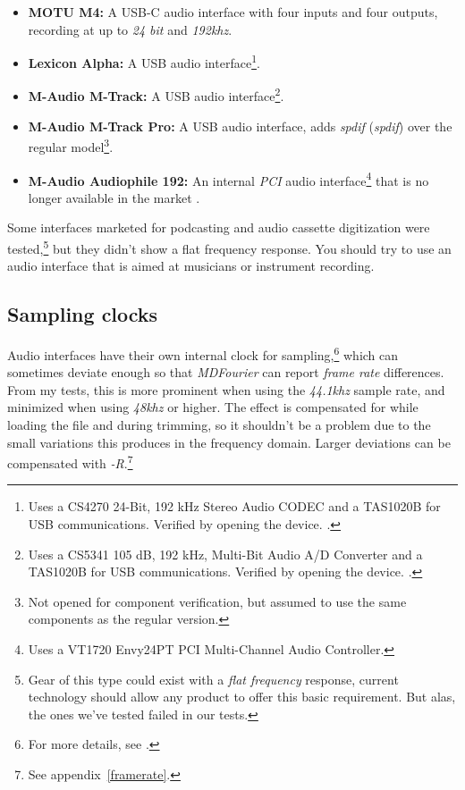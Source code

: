 \documentclass[10pt,a4paper]{report}
\newcommand{\define}[1]{\textit{\acrlong{#1}} (\textit{\acrshort{#1}})}
\newcommand{\khz}[1]{\textit{\mbox{#1\acrshort{khz}}}}
\begin{document}
\begin{appendices}
\begin{itemize}
	\item \textbf{MOTU M4:} A USB-C audio interface with four inputs and four outputs, recording at up to \textit{24 bit} and \khz{192}. \cite{motum4}
	\item \textbf{Lexicon Alpha:} A USB audio interface\footnote{Uses a CS4270 24-Bit, 192 kHz Stereo Audio CODEC and a TAS1020B for USB communications. Verified by opening the device. \cite{lexicon}.}. 
	\item \textbf{M-Audio M-Track:} A USB audio interface\footnote{Uses a CS5341  105 dB, 192 kHz, Multi-Bit Audio A/D Converter and a TAS1020B for USB communications. Verified by opening the device. \cite{maudiomtrack}.}. 
	\item \textbf{M-Audio M-Track Pro:} A USB audio interface, adds \define{spdif} over the regular model\footnote{Not opened for component verification, but assumed to use the same components as the regular version.}. \cite{maudiomtrack}
	\item \textbf{M-Audio Audiophile 192:} An internal \textit{PCI} audio interface\footnote{Uses a VT1720 Envy24PT PCI Multi-Channel Audio Controller.} that is no longer available in the market \cite{maudio}.
\end{itemize}

Some interfaces marketed for podcasting and audio cassette digitization were tested,\footnote{Gear of this type could exist with a \textit{flat frequency} response, current technology should allow any product to offer this basic requirement. But alas, the ones we've tested failed in our tests.} but they didn't show a flat frequency response. You should try to use an audio interface that is aimed at musicians or instrument recording.

\subsection{Sampling clocks}
\label{samplingclocks}

Audio interfaces have their own internal clock for sampling,\footnote{For more details, see \cite{SoundCardClock} \cite{soundcardtiming} \cite{gwsoundcardtiming}.} which can sometimes deviate enough so that \textit{MDFourier} can report \textit{frame rate} differences. From my tests, this is more prominent when using the \khz{44.1} sample rate, and minimized when using \khz{48} or higher. The effect is compensated for while loading the file and during trimming, so it shouldn't be a problem  due to the small variations this produces in the frequency domain. Larger deviations can be compensated with \textit{-R}.\footnote{See appendix~\ref{framerate}.}


\end{appendices}
\end{document}

